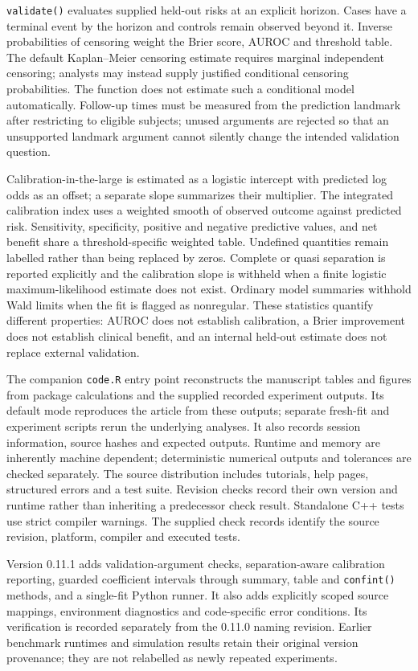 \documentclass[article,nojss]{jss}
\newcommand{\code}[1]{\texttt{#1}}
\begin{document}
\code{validate()} evaluates supplied held-out risks at an explicit horizon. Cases have a terminal event by the horizon and controls remain observed beyond it. Inverse probabilities of censoring weight the Brier score, AUROC and threshold table. The default Kaplan--Meier censoring estimate requires marginal independent censoring; analysts may instead supply justified conditional censoring probabilities. The function does not estimate such a conditional model automatically. Follow-up times must be measured from the prediction landmark after restricting to eligible subjects; unused arguments are rejected so that an unsupported landmark argument cannot silently change the intended validation question.

Calibration-in-the-large is estimated as a logistic intercept with predicted log odds as an offset; a separate slope summarizes their multiplier. The integrated calibration index uses a weighted smooth of observed outcome against predicted risk. Sensitivity, specificity, positive and negative predictive values, and net benefit share a threshold-specific weighted table. Undefined quantities remain labelled rather than being replaced by zeros. Complete or quasi separation is reported explicitly and the calibration slope is withheld when a finite logistic maximum-likelihood estimate does not exist. Ordinary model summaries withhold Wald limits when the fit is flagged as nonregular. These statistics quantify different properties: AUROC does not establish calibration, a Brier improvement does not establish clinical benefit, and an internal held-out estimate does not replace external validation.

The companion \code{code.R} entry point reconstructs the manuscript tables and figures from package calculations and the supplied recorded experiment outputs. Its default mode reproduces the article from these outputs; separate fresh-fit and experiment scripts rerun the underlying analyses. It also records session information, source hashes and expected outputs. Runtime and memory are inherently machine dependent; deterministic numerical outputs and tolerances are checked separately. The source distribution includes tutorials, help pages, structured errors and a test suite. Revision checks record their own version and runtime rather than inheriting a predecessor check result. Standalone C++ tests use strict compiler warnings. The supplied check records identify the source revision, platform, compiler and executed tests.

Version 0.11.1 adds validation-argument checks, separation-aware calibration reporting, guarded coefficient intervals through summary, table and \code{confint()} methods, and a single-fit Python runner. It also adds explicitly scoped source mappings, environment diagnostics and code-specific error conditions. Its verification is recorded separately from the 0.11.0 naming revision. Earlier benchmark runtimes and simulation results retain their original version provenance; they are not relabelled as newly repeated experiments.
\end{document}

